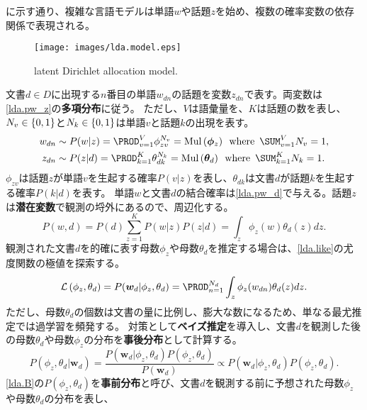 \documentclass[10pt,a4paper]{book}
\begin{document}
に示す通り、複雑な言語モデルは単語$w$や話題$z$を始め、複数の確率変数の依存関係で表現される。

\begin{figure}[h]
\centering
\texttt{[image: images/lda.model.eps]}
\caption{latent Dirichlet allocation model.\label{fig:lda.model}}
\end{figure}

文書$d\!\in\!D$に出現する$n$番目の単語$w_{dn}$の話題を変数$z_{dn}$で表す。両変数は\eqref{lda.pw_z}の\textbf{多項分布}に従う。
ただし、$V$は語彙量を、$K$は話題の数を表し、$N_v\in{}\seq{0,1}$と$N_k\in{}\seq{0,1}$は単語$v$と話題$k$の出現を表す。
%
\begin{equation}
\label{eq:lda.pw_z}
\begin{aligned}
w_{dn} &\sim P(w|z) = \prod_{v=1}^V \phi_{zv}^{N_v} = \Md{\bm{\phi}_z} \where \sum_{v=1}^V N_v = 1,\\
z_{dn} &\sim P(z|d) = \prod_{k=1}^K \theta_{dk}^{N_k} = \Md{\bm{\theta}_d} \where \sum_{k=1}^K N_k = 1.
\end{aligned}
\end{equation}
%
$\phi_{zv}$は話題$z$が単語$v$を生起する確率$P(v|z)$を表し、$\theta_{dk}$は文書$d$が話題$k$を生起する確率$P(k|d)$を表す。
単語$w$と文書$d$の結合確率は\eqref{lda.pw_d}で与える。話題$z$は\textbf{潜在変数}で観測の埒外にあるので、周辺化する。
%
\begin{equation}
\label{eq:lda.pw_d}
P(w,d) = P(d) \sum_{z=1}^K P(w|z) P(z|d) = \int_z \phi_z(w) \theta_d(z) dz.
\end{equation}
%
観測された文書$d$を的確に表す母数$\phi_z$や母数$\theta_d$を推定する場合は、\eqref{lda.like}の尤度関数の極値を探索する。
%
\begin{equation}
\label{eq:lda.like}
\Lk{\phi_z,\theta_d} = P(\bm{w}_d|\phi_z,\theta_d) = \prod_{n=1}^{N_d} \int_z \phi_z(w_{dn}) \theta_d(z) dz.
\end{equation}
%
ただし、母数$\theta_d$の個数は文書の量に比例し、膨大な数になるため、単なる最尤推定では過学習を頻発する。
対策として\textbf{ベイズ推定}を導入し、文書$d$を観測した後の母数$\theta_d$や母数$\phi_z$の分布を\textbf{事後分布}として計算する。
%
\begin{equation}
\label{eq:lda.B}
P(\phi_z,\theta_d|\bm{w}_d)
= \frac{P(\bm{w}_d|\phi_z,\theta_d)P(\phi_z,\theta_d)}{P(\bm{w}_d)}
\propto P(\bm{w}_d|\phi_z,\theta_d)P(\phi_z,\theta_d).
\end{equation}
%
\eqref{lda.B}の$P(\phi_z,\theta_d)$を\textbf{事前分布}と呼び、文書$d$を観測する前に予想された母数$\phi_z$や母数$\theta_d$の分布を表し、
\end{document}
